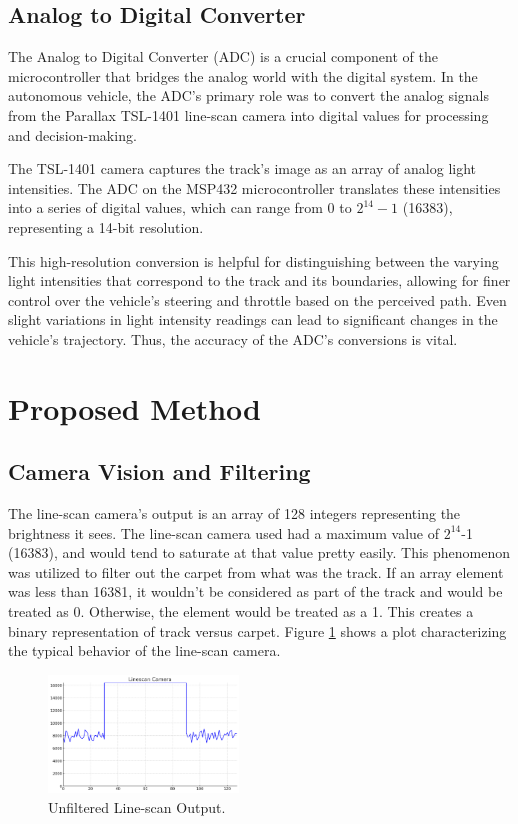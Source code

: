 \documentclass[conference]{IEEEtran}
\begin{document}
\subsection{Analog to Digital Converter}

The Analog to Digital Converter (ADC) is a crucial component of the microcontroller that bridges the analog world with the digital system. In the autonomous vehicle, the ADC's primary role was to convert the analog signals from the Parallax TSL-1401 line-scan camera into digital values for processing and decision-making.

The TSL-1401 camera captures the track's image as an array of analog light intensities. The ADC on the MSP432 microcontroller translates these intensities into a series of digital values, which can range from 0 to $2^{14} - 1$ (16383), representing a 14-bit resolution.

This high-resolution conversion is helpful for distinguishing between the varying light intensities that correspond to the track and its boundaries, allowing for finer control over the vehicle's steering and throttle based on the perceived path. Even slight variations in light intensity readings can lead to significant changes in the vehicle's trajectory. Thus, the accuracy of the ADC's conversions is vital.

\section{Proposed Method}

\subsection{Camera Vision and Filtering}

The line-scan camera's output is an array of 128 integers representing the brightness it sees. The line-scan camera used had a maximum value of $2^{14}$-1 (16383), and would tend to saturate at that value pretty easily. This phenomenon was utilized to filter out the carpet from what was the track. If an array element was less than 16381, it wouldn't be considered as part of the track and would be treated as 0. Otherwise, the element would be treated as a 1. This creates a binary representation of track versus carpet. Figure \ref{fig:linescan} shows a plot characterizing the typical behavior of the line-scan camera.

\begin{figure}[htbp]
	\centerline{\includegraphics[width=0.45\textwidth]{images/linescan.png}}
	\caption{Unfiltered Line-scan Output.}
	\label{fig:linescan}
\end{figure}
\end{document}
